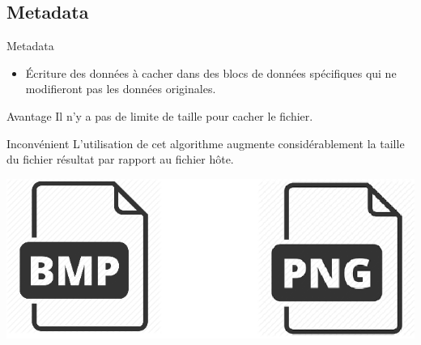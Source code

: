 \documentclass{beamer}
\begin{document}
	\subsection{Metadata}
    \begin{frame}
    
	\begin{block}{Metadata}
	\begin{itemize}
	[circle]
	\item Écriture des données à cacher dans des blocs de données spécifiques 
	qui ne modifieront pas les données originales. 
	\end{itemize}
	\end{block}
	
	\begin{exampleblock}{Avantage} 
	Il n'y a pas de limite de taille pour cacher le fichier. 
	\end{exampleblock}
	
	\begin{alertblock}{Inconvénient} 
	L'utilisation de cet algorithme augmente considérablement la taille du 
	fichier résultat par rapport au fichier hôte. 
	\end{alertblock}
	
	\hspace{3.5cm}
    \includegraphics[scale=0.2]{pictures/meta.png}
    
    \end{frame}
    
\end{document}

